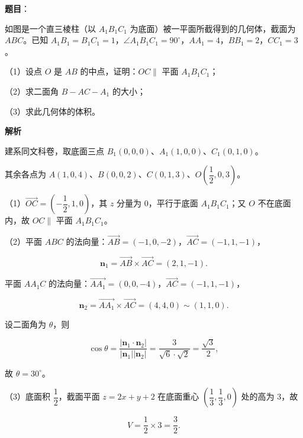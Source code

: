 \begin{answer}

\textbf{题目}：

如图是一个直三棱柱（以 $A_1B_1C_1$ 为底面）被一平面所截得到的几何体，截面为 $ABC$。已知 $A_1B_1=B_1C_1=1$，$\angle A_1B_1C_1=90^\circ$，$AA_1=4$，$BB_1=2$，$CC_1=3$。

（1）设点 $O$ 是 $AB$ 的中点，证明：$OC\parallel$ 平面 $A_1B_1C_1$；

（2）求二面角 $B-AC-A_1$ 的大小；

（3）求此几何体的体积。
\nopagebreak[4]
\begin{center}\end{center}
\nopagebreak[4]
\textbf{解析}

建系同文科卷，取底面三点 $B_1(0,0,0)$、$A_1(1,0,0)$、$C_1(0,1,0)$。

其余各点为 $A(1,0,4)$、$B(0,0,2)$、$C(0,1,3)$、$O\left(\dfrac12,0,3\right)$。

（1）$\overrightarrow{OC}=\left(-\dfrac12,1,0\right)$，其 $z$ 分量为 $0$，平行于底面 $A_1B_1C_1$；又 $O$ 不在底面内，故 $OC\parallel$ 平面 $A_1B_1C_1$。

（2）平面 $ABC$ 的法向量：$\overrightarrow{AB}=(-1,0,-2)$，$\overrightarrow{AC}=(-1,1,-1)$，

\nopagebreak[4]
\[\boldsymbol n_1=\overrightarrow{AB}\times\overrightarrow{AC}=(2,1,-1).\]

平面 $AA_1C$ 的法向量：$\overrightarrow{AA_1}=(0,0,-4)$，$\overrightarrow{AC}=(-1,1,-1)$，

\nopagebreak[4]
\[\boldsymbol n_2=\overrightarrow{AA_1}\times\overrightarrow{AC}=(4,4,0)\sim(1,1,0).\]

设二面角为 $\theta$，则

\nopagebreak[4]
\[\cos\theta=\frac{|\boldsymbol n_1\cdot\boldsymbol n_2|}{|\boldsymbol n_1||\boldsymbol n_2|}=\frac{3}{\sqrt6\cdot\sqrt2}=\frac{\sqrt3}{2},\]

故 $\theta=30^\circ$。

（3）底面积 $\dfrac12$，截面平面 $z=2x+y+2$ 在底面重心 $\left(\dfrac13,\dfrac13,0\right)$ 处的高为 $3$，故

\nopagebreak[4]
\[V=\frac12\times3=\frac32.\]


\end{answer}
